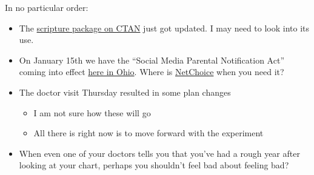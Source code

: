In no particular order:

\begin{itemize}
\tightlist
\item
  The \href{https://www.ctan.org/pkg/scripture}{scripture package on
  CTAN} just got updated. I may need to look into its use.
\item
  On January 15th we have the ``Social Media Parental Notification Act''
  coming into effect
  \href{https://web.archive.org/web/20231228045917/https://fox8.com/news/new-rules-for-ohio-kids-on-social-media-coming-soon/}{here
  in Ohio}. Where is \href{https://netchoice.org}{NetChoice} when you
  need it?
\item
  The doctor visit Thursday resulted in some plan changes

  \begin{itemize}
  \tightlist
  \item
    I am not sure how these will go
  \item
    All there is right now is to move forward with the experiment
  \end{itemize}
\item
  When even one of your doctors tells you that you've had a rough year
  after looking at your chart, perhaps you shouldn't feel bad about
  feeling bad?
\end{itemize}
